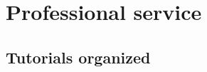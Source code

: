 \documentclass[letterpaper]{article}
\renewenvironment{itemize}{
  \begin{list}{}{
    \setlength{\leftmargin}{1.5em}
  }
}{
  \end{list}
}
\begin{document}





    
    
    

\section*{Professional service}

\subsection*{Tutorials organized}
\end{document}
